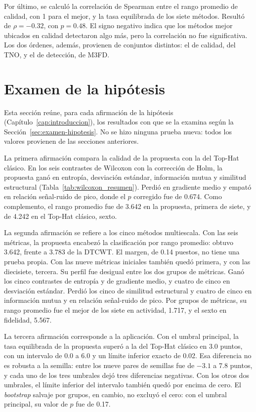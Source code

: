 Por último, se calculó la correlación de Spearman entre el rango promedio de calidad, con 1 para el
mejor, y la tasa equilibrada de los siete métodos. Resultó de $\rho = -0.32$, con $p = 0.48$. El signo
negativo indica que los métodos mejor ubicados en calidad detectaron algo más, pero la correlación no
fue significativa. Los dos órdenes, además, provienen de conjuntos distintos: el de calidad, del TNO, y
el de detección, de M3FD.

\section{Examen de la hipótesis}
\label{sec:res-hipotesis}

Esta sección reúne, para cada afirmación de la hipótesis (Capítulo~\ref{cap:introduccion}), los
resultados con que se la examina según la Sección~\ref{sec:examen-hipotesis}. No se hizo ninguna prueba
nueva: todos los valores provienen de las secciones anteriores.

La primera afirmación compara la calidad de la propuesta con la del Top-Hat clásico. En los seis
contrastes de Wilcoxon con la corrección de Holm, la propuesta ganó en entropía, desviación estándar,
información mutua y similitud estructural (Tabla~\ref{tab:wilcoxon_resumen}). Perdió en gradiente medio
y empató en relación señal-ruido de pico, donde el $p$ corregido fue de 0.674. Como complemento, el rango
promedio fue de 3.642 en la propuesta, primera de siete, y de 4.242 en el Top-Hat clásico, sexto.

La segunda afirmación se refiere a los cinco métodos multiescala. Con las seis métricas, la propuesta
encabezó la clasificación por rango promedio: obtuvo 3.642, frente a 3.783 de la DTCWT. El margen, de
0.14 puestos, no tiene una prueba propia. Con las nueve métricas iniciales también quedó primera, y con
las diecisiete, tercera. Su perfil fue desigual entre los dos grupos de métricas. Ganó los cinco contrastes
de entropía y de gradiente medio, y cuatro de cinco en desviación estándar. Perdió los cinco de
similitud estructural y cuatro de cinco en información mutua y en relación señal-ruido de pico. Por
grupos de métricas, su rango promedio fue el mejor de los siete en actividad, 1.717, y el sexto en
fidelidad, 5.567.

La tercera afirmación corresponde a la aplicación. Con el umbral principal, la tasa equilibrada de la
propuesta superó a la del Top-Hat clásico en 3.0 puntos, con un intervalo de 0.0 a 6.0 y un límite
inferior exacto de 0.02. Esa diferencia no es robusta a la semilla: entre los nueve pares de semillas
fue de $-3.1$ a 7.8 puntos, y cada uno de los tres umbrales dejó tres diferencias negativas. Con los
otros dos umbrales, el límite inferior del intervalo también quedó por encima de cero. El
\textit{bootstrap} salvaje por grupos, en cambio, no excluyó el cero: con el umbral principal, su valor
de $p$ fue de 0.17.

